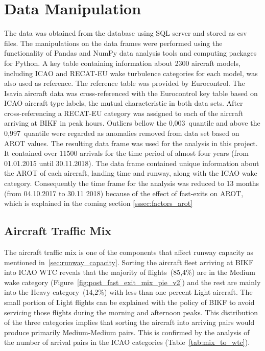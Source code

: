 \section{Data Manipulation}
The data was obtained from the database using SQL server and stored as csv files. The manipulations on the data frames were performed using the functionality of Pandas and NumPy data analysis tools and computing packages for Python. A key table containing information about 2300 aircraft models, including ICAO and RECAT-EU wake turbulence categories for each model, was also used as reference. 
The reference table was provided by Eurocontrol. 
The Isavia aircraft data was cross-referenced with the Eurocontrol key table based on ICAO aircraft type labels, the mutual characteristic in both data sets. 
After cross-referencing a RECAT-EU category was assigned to each of the aircraft arriving at BIKF in peak hours. Outliers bellow the 0,003~quantile and above the 0,997~quantile were regarded as anomalies removed from data set based on AROT values. 
The resulting data frame was used for the analysis in this project. 
It contained over 11500 arrivals for the time period of almost four years (from 01.01.2015 until 30.11.2018). The data frame contained unique information about the AROT of each aircraft, landing time and runway, along with the ICAO wake category. Consequently the time frame for the analysis was reduced to 13 months (from 04.10.2017 to 30.11 2018) because of the effect of fast-exits on AROT, which is explained in the coming section \ref{sssec:factors_arot}


\subsection{Aircraft Traffic Mix\label{ssec:traffic_mix}}
The aircraft traffic mix is one of the components that affect runway capacity as mentioned in~\ref{sec:runway_capacity}. Sorting the aircraft fleet arriving at BIKF into ICAO WTC reveals that the majority of flights~(85,4\%) are in the Medium wake category (Figure~\ref{fig:post_fast_exit_mix_pie_v2}) and the rest are mainly into the Heavy category~(14,2\%) with less than one percent Light aircraft. The small portion of Light flights can be explained with the policy of BIKF to avoid servicing those flights during the morning and afternoon peaks. This distribution of the three categories implies that sorting the aircraft into arriving pairs would produce primarily Medium-Medium pairs. This is confirmed by the analysis of the number of arrival pairs in the ICAO categories (Table~\ref{tab:mix_to_wtc}).\\




